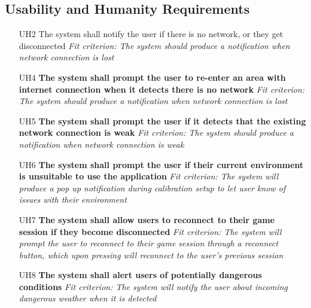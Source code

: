 \documentclass{article}
\begin{document}
\subsection{Usability and Humanity Requirements}
\begin{enumerate}
    \item[UH2] The system shall notify the user if there is no network, or they get disconnected\newline
    \textit{Fit criterion: The system should produce a notification when network connection is lost}
    \item[UH4] \textbf{The system shall prompt the user to re-enter an area with internet connection when it detects there is no network}\newline
    \textit{Fit criterion: The system should produce a notification when network connection is lost}
    \item[UH5] \textbf{The system shall prompt the user if it detects that the existing network connection is weak}\newline
    \textit{Fit criterion: The system should produce a notification when network connection is weak}
    \item[UH6] \textbf{The system shall prompt the user if their current environment is unsuitable to use the application}\newline
    \textit{Fit criterion: The system will produce a pop up notification during calibration setup to let user know of issues with their environment}
    \item[UH7] \textbf{The system shall allow users to reconnect to their game session if they become disconnected}\newline
    \textit{Fit criterion: The system will prompt the user to reconnect to their game session through a reconnect button, which upon pressing will reconnect to the user's previous session}
    \item[UH8] \textbf{The system shall alert users of potentially dangerous conditions} \newline
    \textit{Fit criterion: The system will notify the user about incoming dangerous weather when it is detected}
\end{enumerate}

\end{document}
